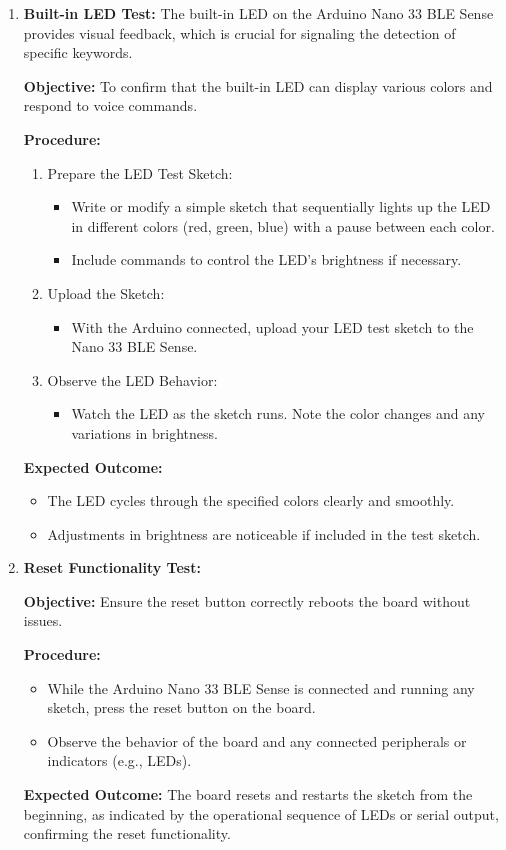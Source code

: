 \begin{enumerate}
\item \textbf{Built-in LED Test:}
The built-in LED on the Arduino Nano 33 BLE Sense provides visual feedback, which is crucial for signaling the detection of specific keywords.

\textbf{Objective:} To confirm that the built-in LED can display various colors and respond to voice commands.

\textbf{Procedure:}
\begin{enumerate}
	\item Prepare the LED Test Sketch:
	\begin{itemize}
		\item Write or modify a simple sketch that sequentially lights up the LED in different colors (red, green, blue) with a pause between each color.
		\item Include commands to control the LED's brightness if necessary.
	\end{itemize}
	\item Upload the Sketch:
	\begin{itemize}
		\item With the Arduino connected, upload your LED test sketch to the Nano 33 BLE Sense.
	\end{itemize}
	\item Observe the LED Behavior:
	\begin{itemize}
		\item Watch the LED as the sketch runs. Note the color changes and any variations in brightness.
	\end{itemize}
\end{enumerate}

\bigskip

\textbf{Expected Outcome:}
\begin{itemize}
	\item The LED cycles through the specified colors clearly and smoothly.
	\item Adjustments in brightness are noticeable if included in the test sketch.
\end{itemize}

\item \textbf{Reset Functionality Test:}

\textbf{Objective:} Ensure the reset button correctly reboots the board without issues.

\textbf{Procedure:}
\begin{itemize}
	\item While the Arduino Nano 33 BLE Sense is connected and running any sketch, press the reset button on the board.
	\item Observe the behavior of the board and any connected peripherals or indicators (e.g., LEDs).
\end{itemize}

\bigskip

\textbf{Expected Outcome:} The board resets and restarts the sketch from the beginning, as indicated by the operational sequence of LEDs or serial output, confirming the reset functionality. 
\end{enumerate}

